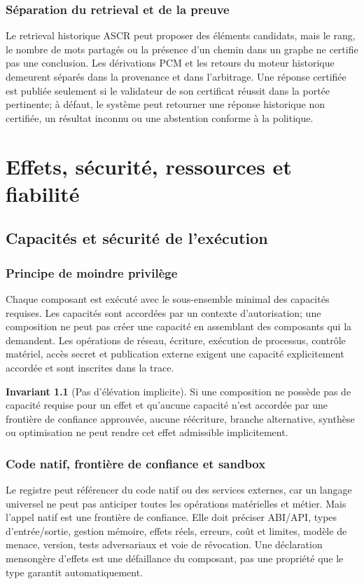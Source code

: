 \documentclass[11pt,a4paper,openany]{book}
\theoremstyle{definition}
\newtheorem{invariant}[definition]{Invariant}
\theoremstyle{plain}
\theoremstyle{remark}
\begin{document}
\section{Séparation du retrieval et de la preuve}
Le retrieval historique ASCR peut proposer des éléments candidats, mais le rang, le nombre de mots partagés ou la présence d'un chemin dans un graphe ne certifie pas une conclusion. Les dérivations PCM et les retours du moteur historique demeurent séparés dans la provenance et dans l'arbitrage. Une réponse certifiée est publiée seulement si le validateur de son certificat réussit dans la portée pertinente; à défaut, le système peut retourner une réponse historique non certifiée, un résultat inconnu ou une abstention conforme à la politique.

\part{Effets, sécurité, ressources et fiabilité}
\chapter{Capacités et sécurité de l'exécution}
\section{Principe de moindre privilège}
Chaque composant est exécuté avec le sous-ensemble minimal des capacités requises. Les capacités sont accordées par un contexte d'autorisation; une composition ne peut pas créer une capacité en assemblant des composants qui la demandent. Les opérations de réseau, écriture, exécution de processus, contrôle matériel, accès secret et publication externe exigent une capacité explicitement accordée et sont inscrites dans la trace.

\begin{invariant}[Pas d'élévation implicite]
Si une composition ne possède pas de capacité requise pour un effet et qu'aucune capacité n'est accordée par une frontière de confiance approuvée, aucune réécriture, branche alternative, synthèse ou optimisation ne peut rendre cet effet admissible implicitement.
\end{invariant}

\section{Code natif, frontière de confiance et sandbox}
Le registre peut référencer du code natif ou des services externes, car un langage universel ne peut pas anticiper toutes les opérations matérielles et métier. Mais l'appel natif est une frontière de confiance. Elle doit préciser ABI/API, types d'entrée/sortie, gestion mémoire, effets réels, erreurs, coût et limites, modèle de menace, version, tests adversariaux et voie de révocation. Une déclaration mensongère d'effets est une défaillance du composant, pas une propriété que le type garantit automatiquement.
\end{document}
